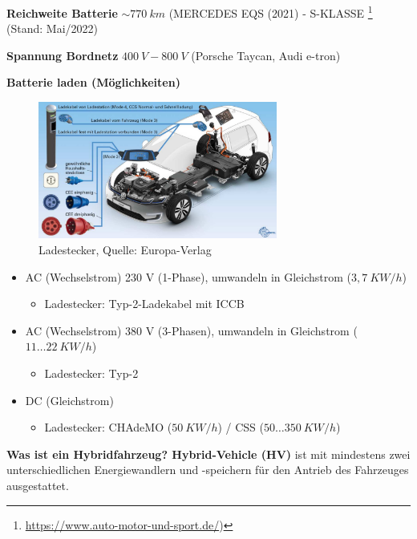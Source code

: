 \textbf{Reichweite Batterie} $\sim 770~km$ (MERCEDES EQS (2021) -
S-KLASSE \footnote{\url{https://www.auto-motor-und-sport.de/})} (Stand:
Mai/2022)

\textbf{Spannung Bordnetz} $400~V - 800~V$ (Porsche Taycan, Audi
e-tron)

\textbf{Batterie laden (Möglichkeiten)}

\begin{figure}[!ht]%
\centering
\includegraphics[width=0.7\textwidth]{images/HV/HV-1.pdf}
\caption{Ladestecker, Quelle: Europa-Verlag}
\end{figure}

\begin{itemize}
\item
  AC (Wechselstrom) 230 V (1-Phase), umwandeln in Gleichstrom
  ($3,7~KW/h$)

  \begin{itemize}
  \item
    Ladestecker: Typ-2-Ladekabel mit ICCB
  \end{itemize}
\item
  AC (Wechselstrom) 380 V (3-Phasen), umwandeln in Gleichstrom
  ($11 \dots 22~KW/h$)

  \begin{itemize}
  \item
    Ladestecker: Typ-2
  \end{itemize}
\item
  DC (Gleichstrom)

  \begin{itemize}
  \item
    Ladestecker: CHAdeMO ($50~KW/h$) / CSS ($50 \dots 350~KW/h$)
  \end{itemize}
\end{itemize}

\textbf{Was ist ein Hybridfahrzeug? Hybrid-Vehicle (HV)} ist mit
mindestens zwei unterschiedlichen Energiewandlern und -speichern für den
Antrieb des Fahrzeuges ausgestattet.

